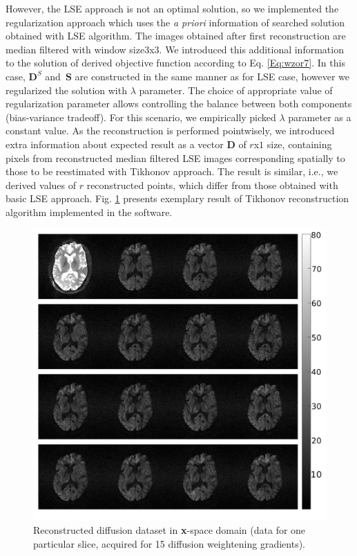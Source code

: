 However, the LSE approach is not an optimal solution, so we implemented the regularization approach which uses the \textit{a priori} information of searched solution obtained with LSE algorithm. The images obtained after first reconstruction are median filtered with window size$3$x$3$. We introduced this additional information to the solution of derived objective function according to Eq. \ref{Eq:wzor7}. In this case, $\textbf{D}^{S}$ and~$\textbf{S}$ are constructed in the same manner as for LSE case, however we regularized the solution with $\lambda$ parameter. The choice of appropriate value of regularization parameter allows controlling the balance between both components (bias-variance tradeoff). For this scenario, we empirically picked $\lambda$ parameter as a constant value. As the reconstruction is performed pointwisely, we introduced extra information about expected result as a vector $\textbf{D}$ of $r$x$1$ size, containing pixels from reconstructed median filtered LSE images corresponding spatially to those to be reestimated with Tikhonov approach. The result is similar, i.e., we derived values of $r$ reconstructed points, which differ from those obtained with basic LSE approach. Fig. \ref{rys:recon} presents exemplary result of Tikhonov reconstruction algorithm implemented in the software. 

\begin{figure}[h!]
\centering
  \includegraphics[scale=0.36]{figures/Module_01/RECON.pdf}
  \caption{Reconstructed diffusion dataset in \textbf{x}-space domain (data for one particular slice, acquired for 15 diffusion weightening gradients).}
  \label{rys:recon}
\end{figure}

